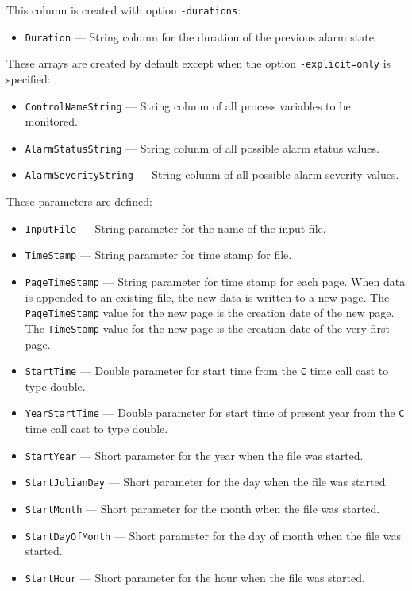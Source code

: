 \begin{itemize}
\begin{itemize}
This column is created with option {\tt -durations}:
\begin{itemize}
        \item {\tt Duration} --- String column for the duration of the previous alarm state.
\end{itemize}

These arrays are created by default except when the option {\tt -explicit=only} is specified:
\begin{itemize}
        \item {\tt ControlNameString} --- String colunm of all process variables to be monitored.
        \item {\tt AlarmStatusString} --- String colunm of all possible alarm status values.
        \item {\tt AlarmSeverityString} --- String colunm of all possible alarm severity values.
\end{itemize}

These parameters are defined:
\begin{itemize}
        \item {\tt InputFile} --- String parameter for the name of the input file.
        \item {\tt TimeStamp} --- String parameter for time stamp for file.
        \item {\tt PageTimeStamp} --- String parameter for time stamp for each page. When data
                is appended to an existing file, the new data is written to a new
                page. The {\tt PageTimeStamp} value for the new page is the creation
                date of the new page. The {\tt TimeStamp} value for the new page is the creation 
                date of the very first page.
        \item {\tt StartTime} --- Double parameter for start time from the {\tt C} time call cast to type double.
        \item {\tt YearStartTime} --- Double parameter for start time of present year from the {\tt C} time call cast to type double.
        \item {\verb+StartYear+} --- Short parameter for the year when the file was started.
        \item {\verb+StartJulianDay+} --- Short parameter for the day when the file was started.
        \item {\verb+StartMonth+} --- Short parameter for the month when the file was started.
        \item {\verb+StartDayOfMonth+} --- Short parameter for the day of month when the file was started.
        \item {\verb+StartHour+} --- Short parameter for the hour when the file was started.
\end{itemize}
\end{itemize} %



\end{itemize}
